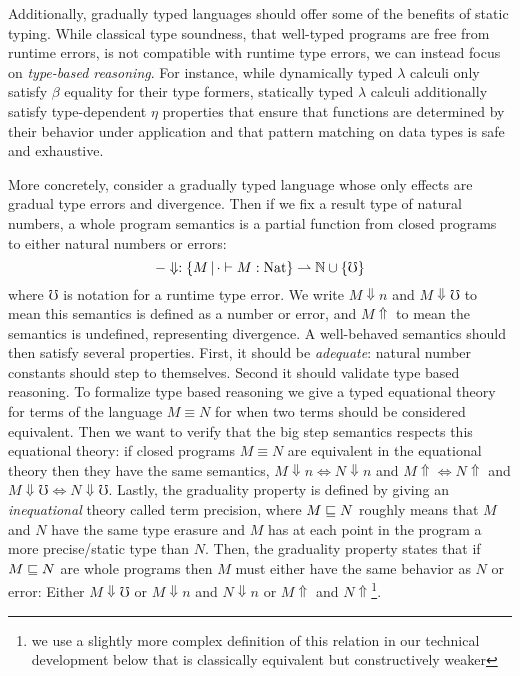 Additionally, gradually typed languages should offer some of the
benefits of static typing. While classical type soundness, that
well-typed programs are free from runtime errors, is not compatible
with runtime type errors, we can instead focus on \emph{type-based
reasoning}. For instance, while dynamically typed $\lambda$ calculi
only satisfy $\beta$ equality for their type formers, statically typed
$\lambda$ calculi additionally satisfy type-dependent $\eta$
properties that ensure that functions are determined by their behavior
under application and that pattern matching on data types
is safe and exhaustive.

More concretely, consider a gradually typed language whose only
effects are gradual type errors and divergence. Then if we fix a
result type of natural numbers, a whole program semantics is a partial
function from closed programs to either natural numbers or errors:
\[ -\Downarrow : \{M \,|\, \cdot \vdash M : \text{Nat} \} \rightharpoonup \mathbb{N} \cup \{\mho\} \]
where $\mho$ is notation for a runtime type error. We write $M
\Downarrow n$ and $M\Downarrow \mho$ to mean this semantics is defined
as a number or error, and $M\Uparrow$ to mean the semantics is
undefined, representing divergence.
%
A well-behaved semantics should then satisfy several properties. First, it
should be \emph{adequate}: natural number constants should step to
themselves. Second it should validate type based reasoning. To
formalize type based reasoning we give a typed equational theory for
terms of the language $M \equiv N$ for when two terms should be
considered equivalent. Then we want to verify that the big step
semantics respects this equational theory: if closed programs $M \equiv
N$ are equivalent in the equational theory then they have the same
semantics, $M \Downarrow n \iff N \Downarrow n$ and $M\Uparrow \iff N
\Uparrow$ and $M \Downarrow \mho \iff N \Downarrow \mho$.
%
Lastly, the graduality property is defined by giving an
\emph{inequational} theory called term precision, where $M \sqsubseteq N$
roughly means that $M$ and $N$ have the same type erasure and $M$ has
at each point in the program a more precise/static type than $N$.
%
Then, the graduality property states that if $M \sqsubseteq N$ are whole
programs then $M$ must either have the same behavior as $N$ or error:
Either $M\Downarrow \mho$ or $M \Downarrow n $ and $N \Downarrow n$ or
$M \Uparrow $ and $N \Uparrow$\footnote{we use a slightly more complex
definition of this relation in our technical development below that is
classically equivalent but constructively weaker}.

